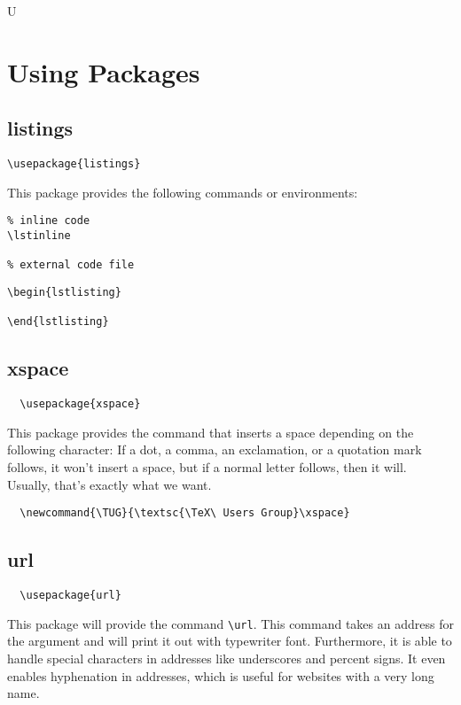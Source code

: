 U\chapter{Using Packages}

\section{listings}
\label{sec:listings}
\begin{lstlisting}
\usepackage{listings}
\end{lstlisting}

This package provides the following commands or environments:
\begin{lstlisting}
% inline code
\lstinline

% external code file

\end{lstlisting}


\begin{verbatim}
\begin{lstlisting}

\end{lstlisting}
\end{verbatim}


\section{xspace}
\begin{lstlisting}
  \usepackage{xspace}
\end{lstlisting}

This package provides the command \xspace that inserts a space depending on the following character: If a dot, a comma, an exclamation, or a quotation mark follows, it won't insert a space, but if a normal letter follows, then it will. Usually, that's exactly what we want.

\lstset{language=TeX}
\begin{lstlisting}
  \newcommand{\TUG}{\textsc{\TeX\ Users Group}\xspace}
\end{lstlisting}


\section{url}
\begin{lstlisting}
  \usepackage{url}
\end{lstlisting}

This package will provide the command \verb|\url|.
This command takes an address for the argument and will print it out with typewriter font.
Furthermore, it is able to handle special characters in addresses like underscores and percent signs.
It even enables hyphenation in addresses, which is useful for websites with a very long name.

